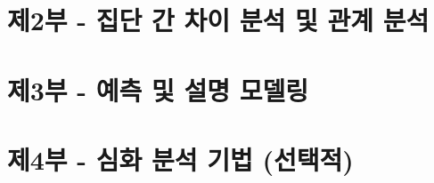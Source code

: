 \documentclass[
  letterpaper,
]{book}
\begin{document}
\part{제2부 - 집단 간 차이 분석 및 관계 분석}

\chapter{}\label{section}

\chapter{}\label{section-1}

\chapter{}\label{section-2}

\part{제3부 - 예측 및 설명 모델링}

\chapter{}\label{section-3}

\chapter{}\label{section-4}

\chapter{}\label{section-5}

\chapter{}\label{section-6}

\chapter{}\label{section-7}

\part{제4부 - 심화 분석 기법 (선택적)}

\chapter{}\label{section-8}
\end{document}
